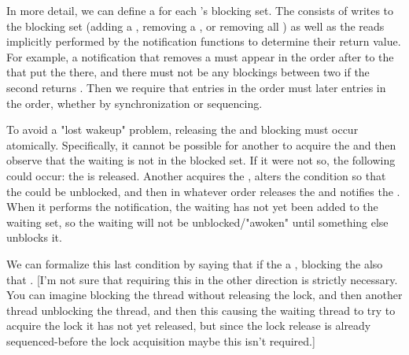 In more detail, we can define a  for each
's blocking set. The  consists of writes to the blocking set (adding a
, removing a , or removing all
) as well as the reads implicitly performed by the
notification functions to determine their return value. For example, a
notification that removes a  must appear in the order
after to the  that put the  there,
and there must not be any  blockings between
two  if the second
 returns . Then we require
that entries in the order must  later entries in
the order, whether by synchronization or sequencing.

To avoid a "lost wakeup" problem,  releasing
the  and blocking must occur atomically. Specifically, it
cannot be possible for another  to acquire the
 and then observe that the waiting  is not in
the blocked set. If it were not so, the following could occur: the
 is released. Another  acquires the
, alters the condition so that the  could be
unblocked, and then in whatever order releases the  and
notifies the . When it performs the
notification, the waiting  has not yet been added to the
waiting set, so the waiting  will not be
unblocked/"awoken" until something else unblocks it.

We can formalize this last condition by saying that if the   a ,
 blocking the  also
 that . [I'm not sure
that requiring this in the other direction is strictly necessary. You
can imagine blocking the thread without releasing the lock, and then
another thread unblocking the thread, and then this causing the
waiting thread to try to acquire the lock it has not yet released, but
since the lock release is already sequenced-before the lock
acquisition maybe this isn't required.]

\endsubsubsection%

\endsubsection%